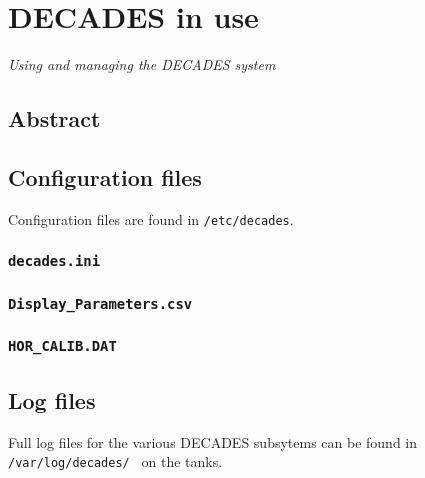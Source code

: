 

\chapter{DECADES in use}
\begin{center}
{\small\em Using and managing the DECADES system}
\end{center}

\section{Abstract}

\section{Configuration files}
Configuration files are found in {\tt/etc/decades}. 
\subsection{\tt decades.ini}
\subsection{\tt Display\_Parameters.csv}
\subsection{\tt HOR\_CALIB.DAT}

\section{Log files}
Full log files for the various DECADES subsytems can be found in {\tt /var/log/decades/ } on the tanks.
\newpage

